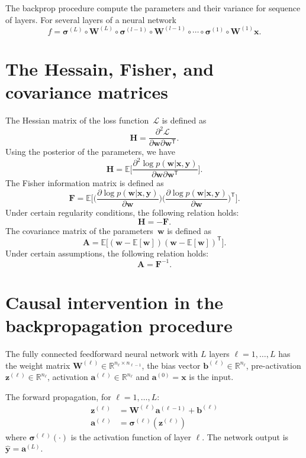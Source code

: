\documentclass[12pt]{article}
\newcommand{\T}{^{\mathsf{T}}}
\newcommand{\eL}{\mathcal{L}}
\newcommand{\bW}{\mathbf{W}}
\newcommand{\ba}{\mathbf{a}}
\newcommand{\bb}{\mathbf{b}}
\newcommand{\bx}{\mathbf{x}}
\newcommand{\by}{\mathbf{y}}
\newcommand{\bz}{\mathbf{z}}
\begin{document}
The backprop procedure compute the parameters and their variance for sequence of layers.
For several layers of a neural network
\[
    f = \boldsymbol{\sigma}^{(L)} \circ \mathbf{W}^{(L)} \circ \boldsymbol{\sigma}^{(l-1)} \circ \mathbf{W}^{(l-1)} \circ \cdots \circ \boldsymbol{\sigma}^{(1)} \circ \mathbf{W}^{(1)} \mathbf{x}.
\]

\section{The Hessain, Fisher, and covariance matrices}
The Hessian matrix of the loss function~$\eL$ is defined as
\[\mathbf{H} = \frac{\partial^2 \eL}{\partial \mathbf
{w} \partial \mathbf{w}^\mathsf{T}}.\]
Using the posterior of the parameters, we have
\[
    \mathbf{H} = \mathbb{E}\Bigg[{\frac{\partial^2 \log p(\mathbf{w}|\mathbf{x}, \mathbf{y})}{\partial \mathbf{w} \partial \mathbf{w}\T}}\Bigg].
\]
The Fisher information matrix is defined as
\[\mathbf{F} = \mathbb{E}\Bigg[\Big(\frac
{\partial \log p(\mathbf{w}|\mathbf{x}, \mathbf{y})}{\partial \mathbf{w}}\Big)\Big(\frac{\partial \log p(\mathbf{w}|\mathbf{x}, \mathbf{y})}{\partial \mathbf{w}}\Big)^\mathsf{T}\Bigg].\]
Under certain regularity conditions, the following relation holds:
\[\mathbf{H} = -\mathbf{F}.\]
The covariance matrix of the parameters~$\mathbf{w}$ is defined as
\[\mathbf{A} = \mathbb{E}\Big[(\mathbf{w} - \mathbb{E}[\mathbf{w}])(\mathbf{w} - \mathbb{E}[\mathbf{w}])^\mathsf{T}\Big].\]
Under certain assumptions, the following relation holds:
\[\mathbf{A} = \mathbf{F}^{-1}.\]

\section*{Causal intervention in the backpropagation procedure}

The fully connected feedforward neural network with $L$ layers $\ell = 1, \dots, L$ has %
the weight matrix $\bW^{(\ell)} \in \mathbb{R}^{n_\ell \times n_{\ell-1}}$, %
the bias vector $\bb^{(\ell)} \in \mathbb{R}^{n_\ell}$, %
pre-activation $\bz^{(\ell)} \in \mathbb{R}^{n_\ell}$, %
activation $\ba^{(\ell)} \in \mathbb{R}^{n_\ell}$ and $\ba^{(0)} = \bx$ is the input.

The forward propagation, for $\ell = 1, \dots, L$:
\begin{align}
\bz^{(\ell)} &= \bW^{(\ell)} \ba^{(\ell-1)} + \bb^{(\ell)} \\
\ba^{(\ell)} &= \boldsymbol{\sigma}^{(\ell)}\!\left( \bz^{(\ell)} \right)
\end{align}
where ${\boldsymbol\sigma}^{(\ell)}(\cdot)$ is the activation function of layer $\ell$.
The network output is $\hat{\by} = \ba^{(L)}$.
\end{document}
